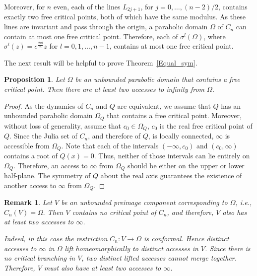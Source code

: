 \documentclass[12pt]{article}
\newtheorem{prop}{Proposition}[section]
\newtheorem{rem}{Remark}[section]
\begin{document}
	Moreover, for $n$ even, each of the lines $L_{2j+1}$, for $j=0, \dots, (n-2)/2$, contains exactly two free critical points, both of which have the same modulus. As these lines are invariant and pass through the origin, a parabolic domain $\Omega$ of $C_n$ can contain at most one free critical point. Therefore, each of $\sigma^{l}(\Omega)$, where $\sigma^{l}(z)=e^{\frac{2\pi l}{n}}z$ for $l=0,1,\dots, n-1$, contains at most one free critical point.
	
	The next result will be helpful to prove Theorem~\ref{Equal_sym}.
	\begin{prop}\label{Para_access}
		Let $\Omega$ be an unbounded parabolic domain that contains a free critical point. Then there are at least two accesses to infinity from $\Omega$.
	\end{prop}
	
	\begin{proof}
		As the dynamics of $C_n$ and $Q$ are equivalent, we assume that $Q$ has an unbounded parabolic domain $\Omega_Q$ that contains a free critical point. Moreover, without loss of generality, assume that $c_0\in \Omega_Q$, $c_0$ is the real free critical point of $Q$.
		Since the Julia set of $C_n$, and therefore of $Q$, is locally connected, $\infty$ is accessible from $\Omega_Q$. 
		Note that each of the intervals $(-\infty, c_0)$ and $(c_0,\infty)$ contains a root of $Q(x)=0$. Thus, neither of those intervals can lie entirely on $\Omega_Q$. Therefore, an access to $\infty$ from $\Omega_Q$ should be either on the upper or lower half-plane. The symmetry of $Q$ about the real axis guarantees the existence of another access to $\infty$ from $\Omega_Q$. 
	\end{proof}
	
	\begin{rem}
		Let $V$ be an unbounded preimage component corresponding to $\Omega$, i.e.,
		$C_n(V)=\Omega.$ Then $V$ contains no critical point of $C_n$, and therefore, $V$ also has at least two accesses to $\infty$.
		
		Indeed, in this case the restriction
		$C_n:V\to \Omega$
		is conformal. Hence distinct accesses to $\infty$ in $\Omega$ lift homeomorphically to distinct accesses in $V$. Since there is no critical branching in $V$, two distinct lifted accesses cannot merge together. Therefore, $V$ must also have at least two accesses to $\infty$.
	\end{rem}
\end{document}
